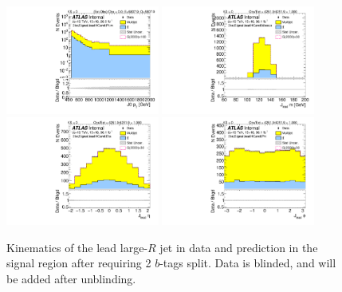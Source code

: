 \clearpage

\begin{figure}[htbp!]
\begin{center}
\includegraphics[width=0.45\textwidth,angle=-90]{figures/boosted/Signal/b77_TwoTag_split_Signal_leadHCand_Pt_m_1_blind.pdf}
\includegraphics[width=0.45\textwidth,angle=-90]{figures/boosted/Signal/b77_TwoTag_split_Signal_leadHCand_Mass_s_blind.pdf}\\
\includegraphics[width=0.45\textwidth,angle=-90]{figures/boosted/Signal/b77_TwoTag_split_Signal_leadHCand_Eta_blind.pdf}
\includegraphics[width=0.45\textwidth,angle=-90]{figures/boosted/Signal/b77_TwoTag_split_Signal_leadHCand_Phi_blind.pdf}
  \caption{Kinematics of the lead large-$R$ jet in data and prediction in the signal region after requiring 2 $b$-tags split. Data is blinded, and will be added after unblinding.}
  \label{fig:boosted-2bs-signal-blind-ak10-lead}
\end{center}
\end{figure}

